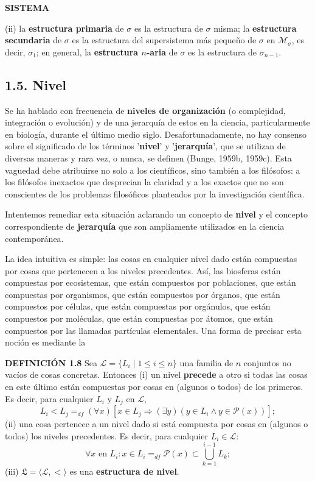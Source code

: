 
\newpage
\fancyhf{}
\fancyhead[r]{\thepage} 
\begin{center}
{\fontsize{16}{18}\selectfont \textbf{SISTEMA}}
\end{center}
\vspace{0.5cm}

{\fontsize{13}{15}\selectfont
(ii) la \textbf{estructura primaria} de $\sigma$ es la estructura de $\sigma$ misma; la \textbf{estructura secundaria} de $\sigma$ es la estructura del supersistema más pequeño de $\sigma$ en $\mathcal{M}_{\sigma}$, es decir, $\sigma_1$; en general, la \textbf{estructura $n$-aria} de $\sigma$ es la estructura de $\sigma_{n-1}$.

\subsection*{1.5. Nivel}
Se ha hablado con frecuencia de \textbf{niveles de organización} (o complejidad, integración o evolución) y de una jerarquía de estos en la ciencia, particularmente en biología, durante el último medio siglo. Desafortunadamente, no hay consenso sobre el significado de los términos '\textbf{nivel}' y '\textbf{jerarquía}', que se utilizan de diversas maneras y rara vez, o nunca, se definen (Bunge, 1959b, 1959c). Esta vaguedad debe atribuirse no solo a los científicos, sino también a los filósofos: a los filósofos inexactos que desprecian la claridad y a los exactos que no son conscientes de los problemas filosóficos planteados por la investigación científica.

Intentemos remediar esta situación aclarando un concepto de \textbf{nivel} y el concepto correspondiente de \textbf{jerarquía} que son ampliamente utilizados en la ciencia contemporánea.

La idea intuitiva es simple: las cosas en cualquier nivel dado están compuestas por cosas que pertenecen a los niveles precedentes. Así, las biosferas están compuestas por ecosistemas, que están compuestos por poblaciones, que están compuestas por organismos, que están compuestos por órganos, que están compuestos por células, que están compuestas por orgánulos, que están compuestos por moléculas, que están compuestas por átomos, que están compuestos por las llamadas partículas elementales. Una forma de precisar esta noción es mediante la

\textbf{DEFINICIÓN 1.8} Sea $\mathcal{L} = \{L_i \mid 1 \le i \le n\}$ una familia de $n$ conjuntos no vacíos de cosas concretas. Entonces
(i) un nivel \textbf{precede} a otro si todas las cosas en este último están compuestas por cosas en (algunos o todos) de los primeros. Es decir, para cualquier $L_i$ y $L_j$ en $\mathcal{L}$,
$$ L_i < L_j =_{df} (\forall x)[x \in L_j \Rightarrow (\exists y) (y \in L_i \land y \in \mathcal{P}(x))] ; $$
(ii) una cosa pertenece a un nivel dado si está compuesta por cosas en (algunos o todos) los niveles precedentes. Es decir, para cualquier $L_i \in \mathcal{L}$:
$$ \forall x \text{ en } L_i : x \in L_i =_{df} \mathcal{P}(x) \subset \bigcup_{k=1}^{i-1} L_k ; $$
(iii) $\mathfrak{L} = \langle \mathcal{L}, < \rangle$ es una \textbf{estructura de nivel}.

}
